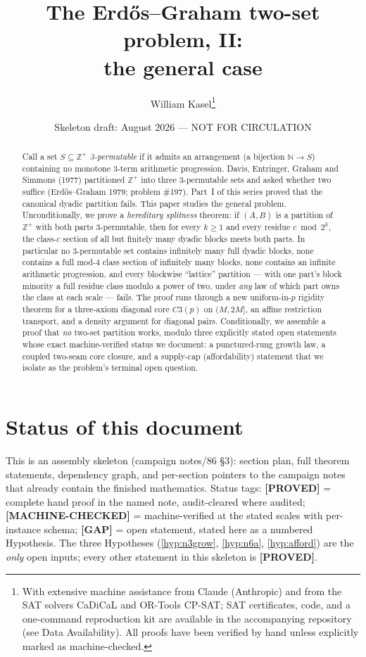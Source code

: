 \documentclass[11pt]{article}
\title{The Erd\H{o}s--Graham two-set problem, II:\\ the general case}
\author{William Kasel\thanks{With extensive machine assistance from Claude
(Anthropic) and from the SAT solvers CaDiCaL and OR-Tools CP-SAT; SAT
certificates, code, and a one-command reproduction kit are available in the
accompanying repository (see Data Availability).  All proofs have been verified
by hand unless explicitly marked as machine-checked.}}
\date{Skeleton draft: August 2026 --- NOT FOR CIRCULATION}
\theoremstyle{definition}
\newcommand{\Z}{\mathbb{Z}}
\newcommand{\N}{\mathbb{N}}
\newcommand{\status}[1]{\textbf{[#1]}}
\begin{document}
\maketitle

\begin{abstract}
Call a set $S \subseteq \Z^+$ \emph{3-permutable} if it admits an arrangement
(a bijection $\N \to S$) containing no monotone 3-term arithmetic progression.
Davis, Entringer, Graham and Simmons (1977) partitioned $\Z^+$ into three
3-permutable sets and asked whether two suffice (Erd\H{o}s--Graham 1979;
problem \#197).  Part~I of this series proved that the canonical dyadic
partition fails.  This paper studies the general problem.  Unconditionally, we
prove a \emph{hereditary splitness} theorem: if $(A,B)$ is a partition of
$\Z^+$ with both parts 3-permutable, then for every $k \ge 1$ and every residue
$c \bmod 2^k$, the class-$c$ section of all but finitely many dyadic blocks
meets both parts.  In particular no 3-permutable set contains infinitely many
full dyadic blocks, none contains a full mod-$4$ class section of infinitely
many blocks, none contains an infinite arithmetic progression, and every
blockwise ``lattice'' partition --- with one part's block minority a full
residue class modulo a power of two, under \emph{any} law of which part owns
the class at each scale --- fails.  The proof runs through a new
uniform-in-$p$ rigidity theorem for a three-axiom diagonal core $C3(p)$ on
$(M, 2M]$, an affine restriction transport, and a density argument for
diagonal pairs.  Conditionally, we assemble a proof that \emph{no} two-set
partition works, modulo three explicitly stated open statements whose exact
machine-verified status we document: a punctured-rung growth law, a coupled
two-seam core closure, and a supply-cap (affordability) statement that we
isolate as the problem's terminal open question.
\end{abstract}

\section*{Status of this document}

This is an assembly skeleton (campaign notes/86 \S3): section plan, full
theorem statements, dependency graph, and per-section pointers to the
campaign notes that already contain the finished mathematics.  Status tags:
\status{PROVED} = complete hand proof in the named note, audit-cleared where
audited; \status{MACHINE-CHECKED} = machine-verified at the stated scales
with per-instance schema; \status{GAP} = open statement, stated here as a
numbered Hypothesis.  The three Hypotheses (\ref{hyp:n3grow},
\ref{hyp:n6a}, \ref{hyp:afford}) are the \emph{only} open inputs; every
other statement in this skeleton is \status{PROVED}.
\end{document}
